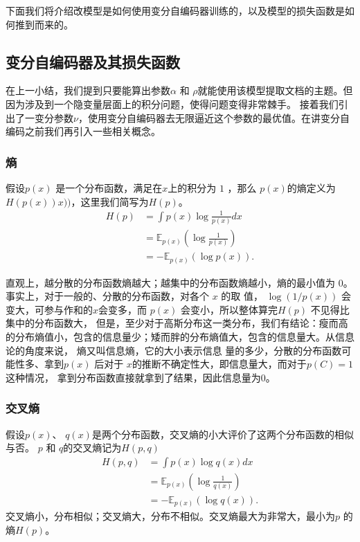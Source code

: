 \documentclass[twocolumn]{article}
\begin{document}
    下面我们将介绍改模型是如何使用变分自编码器训练的，以及模型的损失函数是如何推到而来的。

\subsection{变分自编码器及其损失函数}
    在上一小结，我们提到只要能算出参数$ \alpha $ 和 $ \rho $就能使用该模型提取文档的主题。但因为涉及到一个隐变量层面上的积分问题，使得问题变得非常棘手。
    接着我们引出了一变分参数$ \nu $，使用变分自编码器去无限逼近这个参数的最优值。在讲变分自编码之前我们再引入一些相关概念。
\subsubsection{熵}
    假设$ p(x) $ 是一个分布函数，满足在$  x  $上的积分为 $ 1 $ ，那么 $ p(x)  $的熵定义为$  H(p(x)) x)) $，这里我们简写为$  H(p) $。
\begin{equation}
    \begin{aligned}
        H(p) &= \int p(x)\log \frac{1}{p(x)} dx\\
            &= \mathbb{E}_{p(x)}(\log \frac{1}{p(x)}) \\
            &= - \mathbb{E}_{p(x)}(\log p(x)).
    \end{aligned}
    \label{eq:003}
\end{equation}

    直观上，越分散的分布函数熵越大；越集中的分布函数熵越小，熵的最小值为 $ 0 $。事实上，对于一般的、分散的分布函数，对各个 $ x $ 的取
    值， $ \log(1/p(x)) $ 会变大，可参与作和的$  x  $会变多，而 $ p(x) $    会变小，所以整体算完$  H(p) $ 不见得比集中的分布函数大，
    但是，至少对于高斯分布这一类分布，我们有结论：瘦而高的分布熵值小，包含的信息量少；矮而胖的分布熵值大，包含的信息量大。从信息论的角度来说，
    熵又叫信息熵，它的大小表示信息    量的多少，分散的分布函数可能性多、拿到$  p(x) $ 后对于 $ x $的推断不确定性大，即信息量大，而对于$  p(C)=1  $这种情况，
    拿到分布函数直接就拿到了结果，因此信息量为$ 0 $。
    
\subsubsection{交叉熵}
    假设$     p(x)  $、 $ q(x)  $是两个分布函数，交叉熵的小大评价了这两个分布函数的相似与否。 $ p $ 和 $ q  $的交叉熵记为$  H(p, q) $
\begin{equation}
    \begin{aligned}
        H(p, q) &= \int p(x)\log q(x) dx \\
            &= \mathbb{E}_{p(x)}(\log \frac{1}{q(x)}) \\
            &= - \mathbb{E}_{p(x)}(\log q(x)).
    \end{aligned}
    \label{eq:004}
\end{equation}
    交叉熵小，分布相似；交叉熵大，分布不相似。交叉熵最大为非常大，最小为$ p $ 的熵$  H(p) $。
    
\end{document}
